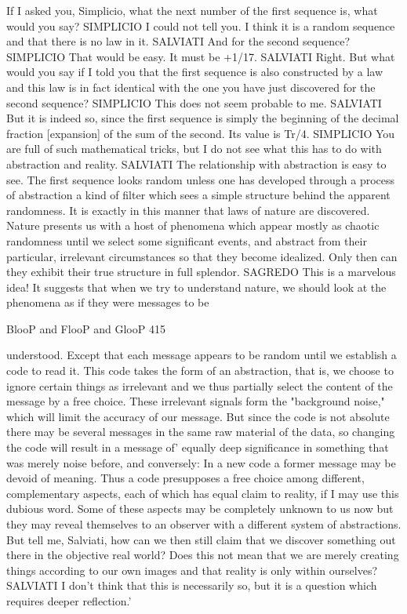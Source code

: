       If I asked you, Simplicio, what the next number of the first sequence is, what
  would you say?
      SIMPLICIO I could not tell you. I think it is a random sequence and that there is
  no law in it.
      SALVIATI And for the second sequence?
      SIMPLICIO That would be easy. It must be +1/17.
      SALVIATI Right. But what would you say if I told you that the first
      sequence is also constructed by a law and this law is in fact identical with the
      one you have just discovered for the second sequence? SIMPLICIO This does not
  seem probable to me.
      SALVIATI But it is indeed so, since the first sequence is simply the beginning of
  the decimal fraction [expansion] of the sum of the second. Its value is Tr/4.
      SIMPLICIO You are full of such mathematical tricks, but I do not see what this
  has to do with abstraction and reality.
      SALVIATI The relationship with abstraction is easy to see. The first sequence
  looks random unless one has developed through a process of abstraction a kind of
  filter which sees a simple structure behind the apparent randomness.
      It is exactly in this manner that laws of nature are discovered. Nature
      presents us with a host of phenomena which appear mostly as chaotic randomness
  until we select some significant events, and abstract from their particular, irrelevant
  circumstances so that they become idealized. Only then can they exhibit their true
  structure in full splendor.
      SAGREDO This is a marvelous idea! It suggests that when we try to understand
  nature, we should look at the phenomena as if they were messages to be




BlooP and FlooP and GlooP                                                                 415

  understood. Except that each message appears to be random until we establish a code
  to read it. This code takes the form of an abstraction, that is, we choose to ignore
  certain things as irrelevant and we thus partially select the content of the message by
  a free choice. These irrelevant signals form the "background noise," which will limit
  the accuracy of our message.
     But since the code is not absolute there may be several messages in the same raw
  material of the data, so changing the code will result in a message of' equally deep
  significance in something that was merely noise before, and conversely: In a new
  code a former message may be devoid of meaning.
     Thus a code presupposes a free choice among different, complementary aspects,
  each of which has equal claim to reality, if I may use this dubious word.
     Some of these aspects may be completely unknown to us now but they may
  reveal themselves to an observer with a different system of abstractions.
     But tell me, Salviati, how can we then still claim that we discover something out
  there in the objective real world? Does this not mean that we are merely creating
  things according to our own images and that reality is only within ourselves?
     SALVIATI I don't think that this is necessarily so, but it is a question which
  requires deeper reflection.'

